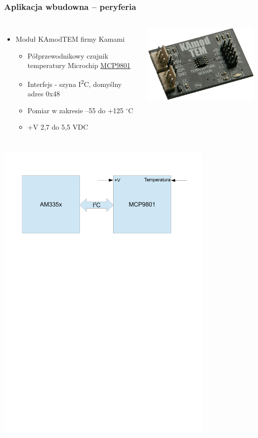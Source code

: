 \documentclass[dvipsnames,table]{beamer}
\begin{document}
\begin{frame}
\frametitle{Aplikacja wbudowna -- peryferia}
\begin{columns}[c]
\column{3in}
\begin{itemize}
	\item Moduł KAmodTEM firmy Kamami
	\begin{itemize}
		\item Półprzewodnikowy czujnik temperatury Microchip \href{http://www.microchip.com/wwwproducts/Devices.aspx?dDocName=en020950}{MCP9801}
		\item Interfejs - szyna I\textsuperscript{2}C, domyślny adres 0x48
		\item Pomiar w zakresie --55 do +125 $^\circ$C 
		\item +V 2,7 do 5,5 VDC
	\end{itemize}
\end{itemize}
\column{1.5in}
	\includegraphics[scale=0.3]{img_kamodtem.jpg}
\end{columns}
\includegraphics[width=300pt]{img_am335x-mcp9801.pdf}
\end{frame}
\end{document}
